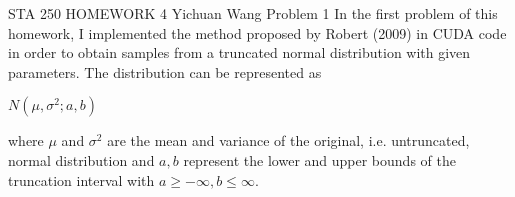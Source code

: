 \documentclass[12pt]{article}
\begin{document}
\noindent STA 250 HOMEWORK 4 \newline Yichuan Wang \newline \newline
Problem 1 \newline \newline
In the first problem of this homework, I implemented the method proposed by Robert (2009) in CUDA code in order to obtain samples from a truncated normal distribution with given parameters. The distribution can be represented as
\begin{center}
	$N(\mu, \sigma^2; a, b)$
\end{center}
where $\mu$ and $\sigma^2$ are the mean and variance of the original, i.e. untruncated, normal distribution and $a, b$ represent the lower and upper bounds of the truncation interval with $a \geq -\infty, b \leq \infty$.
\end{document}
